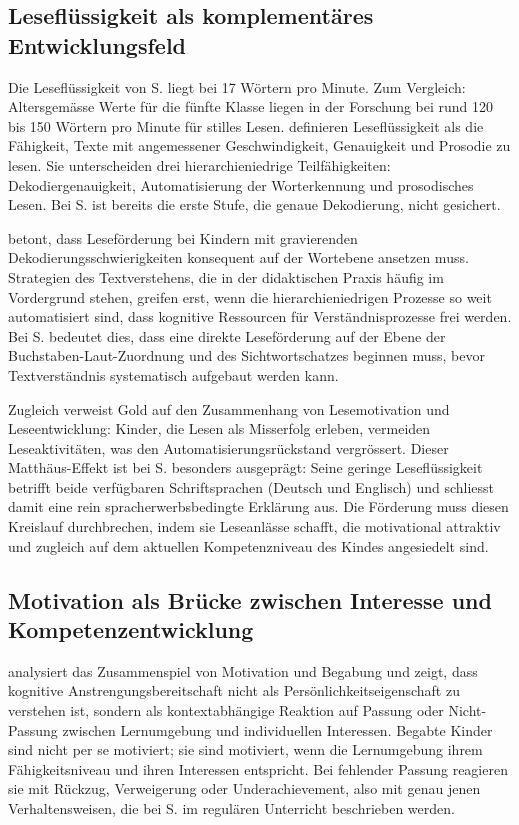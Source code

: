 \documentclass[ngerman, a4paper]{article}
\begin{document}
\subsection{Leseflüssigkeit als komplementäres Entwicklungsfeld}

Die Leseflüssigkeit von S. liegt bei 17 Wörtern pro Minute. Zum Vergleich: Altersgemässe
Werte für die fünfte Klasse liegen in der Forschung bei rund 120 bis 150 Wörtern pro
Minute für stilles Lesen. \textcite[Kap.\,1--4]{rosebrock2010grundlagen} definieren Leseflüssigkeit als die Fähigkeit,
Texte mit angemessener Geschwindigkeit, Genauigkeit und Prosodie zu lesen. Sie
unterscheiden drei hierarchieniedrige Teilfähigkeiten: Dekodiergenauigkeit,
Automatisierung der Worterkennung und prosodisches Lesen. Bei S. ist bereits die
erste Stufe, die genaue Dekodierung, nicht gesichert.

\textcite[Kap.\,1--4]{gold2018lesenkannmanlernen} betont, dass Leseförderung bei Kindern mit gravierenden
Dekodierungsschwierigkeiten konsequent auf der Wortebene ansetzen muss. Strategien
des Textverstehens, die in der didaktischen Praxis häufig im Vordergrund stehen,
greifen erst, wenn die hierarchieniedrigen Prozesse so weit automatisiert sind, dass
kognitive Ressourcen für Verständnisprozesse frei werden. Bei S. bedeutet dies, dass
eine direkte Leseförderung auf der Ebene der Buchstaben-Laut-Zuordnung und des
Sichtwortschatzes beginnen muss, bevor Textverständnis systematisch aufgebaut werden
kann.

Zugleich verweist Gold auf den Zusammenhang von Lesemotivation und Leseentwicklung:
Kinder, die Lesen als Misserfolg erleben, vermeiden Leseaktivitäten, was den
Automatisierungsrückstand vergrössert. Dieser Matthäus-Effekt ist bei S.
besonders ausgeprägt: Seine geringe Leseflüssigkeit betrifft beide verfügbaren
Schriftsprachen (Deutsch und Englisch) und schliesst damit eine rein
spracherwerbsbedingte Erklärung aus. Die Förderung muss diesen Kreislauf
durchbrechen, indem sie Leseanlässe schafft, die motivational attraktiv und zugleich
auf dem aktuellen Kompetenzniveau des Kindes angesiedelt sind.

\subsection{Motivation als Brücke zwischen Interesse und Kompetenzentwicklung}

\textcite[S.\,84--89]{lehwald2017motivation} analysiert das Zusammenspiel von Motivation und Begabung und zeigt, dass
kognitive Anstrengungsbereitschaft nicht als Persönlichkeitseigenschaft zu verstehen ist,
sondern als kontextabhängige Reaktion auf Passung oder Nicht-Passung zwischen
Lernumgebung und individuellen Interessen. Begabte Kinder sind nicht per se motiviert;
sie sind motiviert, wenn die Lernumgebung ihrem Fähigkeitsniveau und ihren Interessen
entspricht. Bei fehlender Passung reagieren sie mit Rückzug, Verweigerung oder
Underachievement, also mit genau jenen Verhaltensweisen, die bei S. im regulären
Unterricht beschrieben werden.
\end{document}
